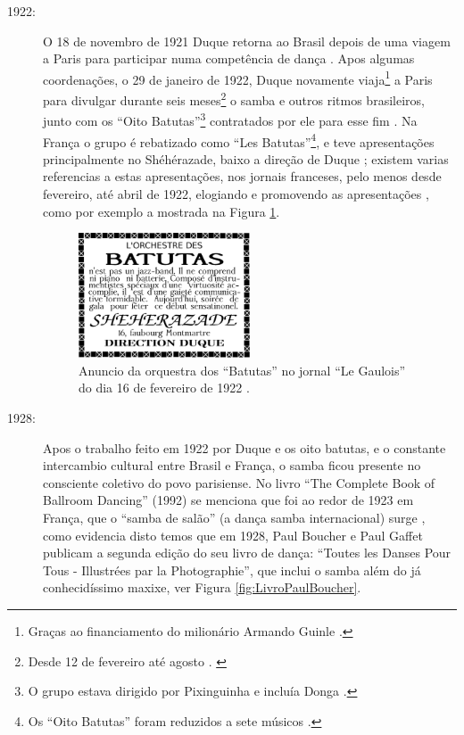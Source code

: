 \begin{description}
\item[1922:] O 18 de novembro de 1921 Duque retorna ao Brasil depois de uma viagem a Paris 
para participar numa competência de dança \cite[pp. 465]{marcondes1977enciclopedia} \cite[pp. 3]{duque1921:a}.
Apos algumas coordenações,
o 29 de janeiro de 1922, Duque novamente viaja\footnote{Graças 
ao financiamento do milionário Armando Guinle \cite[pp. 465]{marcondes1977enciclopedia}.} 
 a Paris para divulgar durante seis meses\footnote{Desde 
12 de fevereiro até agosto \cite{BASTOS2005}. \cite[pp. 5]{batutas1922:c}} 
o samba e outros ritmos brasileiros, 
junto com os ``Oito Batutas''\footnote{O 
grupo estava dirigido por Pixinguinha e incluía Donga \cite{BASTOS2005}.} 
contratados por ele para esse fim
\cite[pp. 13]{duque1922:a} \cite[pp. 465]{marcondes1977enciclopedia}.
Na França o grupo é rebatizado como ``Les Batutas''\footnote{Os 
``Oito Batutas'' foram reduzidos a sete músicos \cite{BASTOS2005}.},
e teve apresentações principalmente no Shéhérazade, 
baixo a direção de Duque \cite[pp. 465]{marcondes1977enciclopedia} \cite{BASTOS2005};
existem varias referencias a estas apresentações, nos jornais franceses, pelo menos desde fevereiro,
até abril de 1922, elogiando e promovendo as apresentações 
\cite[pp. 5]{batutas1922:a} \cite[pp. 4]{batutas1922:b} \cite{batutas1922:d},
como por exemplo a mostrada na Figura \ref{fig:LesBatutas}.


  \begin{figure}[h!]
    \centering
    \includegraphics[width=0.5\textwidth]{chapters/cap-historia-sambagafieira/batutas.eps}
    \caption{Anuncio da orquestra dos ``Batutas'' no jornal ``Le Gaulois'' do dia 16 de fevereiro de 1922 \cite[pp. 4]{batutas1922:b}.}
    \label{fig:LesBatutas}
  \end{figure}

\item[1928:] Apos o trabalho feito em 1922 por Duque e os oito batutas, e o constante intercambio cultural entre Brasil e França, 
o samba ficou presente no consciente coletivo do povo parisiense.
No livro ``The Complete Book of Ballroom Dancing'' (1992) se menciona que foi ao redor de 1923
em França, que o ``samba de salão'' (a dança samba internacional) surge \cite[pp. 45]{stephenson1992complete},
como evidencia disto temos que em 1928, 
Paul Boucher e Paul Gaffet publicam  a segunda edição do seu livro de dança:
``Toutes les Danses Pour Tous - Illustrées par la Photographie'',
que inclui o samba além do já conhecidíssimo maxixe, ver Figura \ref{fig:LivroPaulBoucher}.


\end{description}
